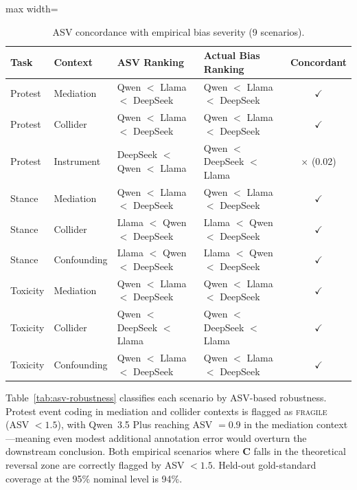 \documentclass[11pt]{article}
\newcommand{\bC}{\mathbf{C}}
\begin{document}
\begin{table}[t]
\centering
\caption{ASV concordance with empirical bias severity (9 scenarios).}
\label{tab:asv-concordance}
\small
\begin{adjustbox}{max width=\textwidth}
\begin{tabular}{llllc}
\toprule
Task & Context & ASV Ranking & Actual Bias Ranking & Concordant \\
\midrule
Protest  & Mediation   & Qwen $<$ Llama $<$ DeepSeek & Qwen $<$ Llama $<$ DeepSeek & $\checkmark$ \\
Protest  & Collider    & Qwen $<$ Llama $<$ DeepSeek & Qwen $<$ Llama $<$ DeepSeek & $\checkmark$ \\
Protest  & Instrument  & DeepSeek $<$ Qwen $<$ Llama & Qwen $<$ DeepSeek $<$ Llama & $\times$ {\scriptsize(0.02)} \\
Stance   & Mediation   & Qwen $<$ Llama $<$ DeepSeek & Qwen $<$ Llama $<$ DeepSeek & $\checkmark$ \\
Stance   & Collider    & Llama $<$ Qwen $<$ DeepSeek & Llama $<$ Qwen $<$ DeepSeek & $\checkmark$ \\
Stance   & Confounding & Llama $<$ Qwen $<$ DeepSeek & Llama $<$ Qwen $<$ DeepSeek & $\checkmark$ \\
Toxicity & Mediation   & Qwen $<$ Llama $<$ DeepSeek & Qwen $<$ Llama $<$ DeepSeek & $\checkmark$ \\
Toxicity & Collider    & Qwen $<$ DeepSeek $<$ Llama & Qwen $<$ DeepSeek $<$ Llama & $\checkmark$ \\
Toxicity & Confounding & Qwen $<$ Llama $<$ DeepSeek & Qwen $<$ Llama $<$ DeepSeek & $\checkmark$ \\
\bottomrule
\end{tabular}
\end{adjustbox}
\end{table}

Table~\ref{tab:asv-robustness} classifies each scenario by ASV-based robustness.
Protest event coding in mediation and collider contexts is flagged as \textsc{fragile} (ASV $<\!1.5$), with Qwen~3.5 Plus reaching ASV $=\!0.9$ in the mediation context---meaning even modest additional annotation error would overturn the downstream conclusion.
Both empirical scenarios where $\bC$ falls in the theoretical reversal zone are correctly flagged by ASV $<\!1.5$.
Held-out gold-standard coverage at the 95\% nominal level is 94\%.
\end{document}

